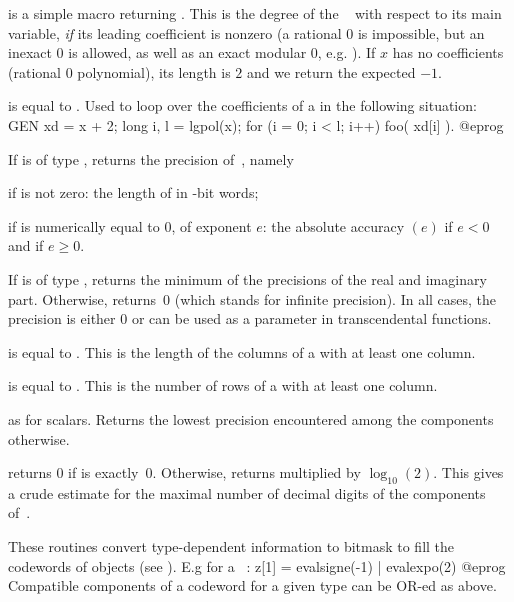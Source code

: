  is a simple macro returning .
This is the degree of the ~ with respect to its main
variable, \emph{if} its leading coefficient is nonzero (a rational $0$ is
impossible, but an inexact $0$ is allowed, as well as an exact modular $0$,
e.g. ). If $x$ has no coefficients (rational $0$ polynomial),
its length is $2$ and we return the expected $-1$.

 is equal to . Used to loop over
the coefficients of a  in the following situation:
\bprog
    GEN xd = x + 2;
    long i, l = lgpol(x);
    for (i = 0; i < l; i++) foo( xd[i] ).
@eprog

 If  is of type , returns the
precision of~, namely

\item if  is not zero: the length of  in \B-bit words;

\item if  is numerically equal to $0$, of exponent $e$:
the absolute accuracy $(e)$ if $e < 0$ and
 if $e \geq 0$.

If  is of type , returns the minimum of the precisions of
the real and imaginary part. Otherwise, returns~0 (which stands for infinite
precision). In all cases, the precision is either $0$ or can be used as a
 parameter in transcendental functions.

 is equal to . This is the length
of the columns of a  with at least one column.

 is equal to . This is the number
of rows of a  with at least one column.

 as  for scalars. Returns the
lowest precision encountered among the components otherwise.

 returns 0 if  is exactly~0. Otherwise,
returns  multiplied by $\log_{10}(2)$. This gives a crude
estimate for the maximal number of decimal digits of the components
of~.

These routines convert type-dependent information to bitmask to fill the
codewords of  objects (see ). E.g for a
~:
\bprog
  z[1] = evalsigne(-1) | evalexpo(2)
@eprog
Compatible components of a codeword for a given type can be OR-ed as above.

